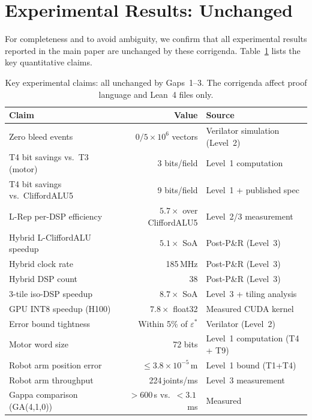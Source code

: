 \documentclass[11pt,a4paper]{article}
\theoremstyle{definition}
\theoremstyle{plain}
\theoremstyle{remark}
\begin{document}
\section{Experimental Results: Unchanged}
\label{sec:exp-unchanged}

For completeness and to avoid ambiguity, we confirm that all
experimental results reported in the main paper are unchanged by
these corrigenda.
Table~\ref{tab:unchanged} lists the key quantitative claims.

\begin{table}[h]
\centering
\caption{Key experimental claims: all unchanged by Gaps~1--3.
The corrigenda affect proof language and Lean~4 files only.}
\label{tab:unchanged}
\small
\begin{tabular}{p{5cm}rp{5cm}}
\toprule
Claim & Value & Source \\
\midrule
Zero bleed events & $0 / 5\times10^6$ vectors & Verilator simulation (Level~2) \\
T4 bit savings vs.\ T3 (motor) & 3 bits/field & Level~1 computation \\
T4 bit savings vs.\ CliffordALU5 & 9 bits/field & Level~1 + published spec \\
L-Rep per-DSP efficiency & $5.7\times$ over CliffordALU5 & Level~2/3 measurement \\
Hybrid L-CliffordALU speedup & $5.1\times$ SoA & Post-P\&R (Level~3) \\
Hybrid clock rate & 185\,MHz & Post-P\&R (Level~3) \\
Hybrid DSP count & 38 & Post-P\&R (Level~3) \\
3-tile iso-DSP speedup & $8.7\times$ SoA & Level~3 + tiling analysis \\
GPU INT8 speedup (H100) & $7.8\times$ float32 & Measured CUDA kernel \\
Error bound tightness & Within 5\% of $\varepsilon^*$ & Verilator (Level~2) \\
Motor word size & 72 bits & Level~1 computation (T4 + T9) \\
Robot arm position error & $\le 3.8\times10^{-5}$\,m & Level~1 bound (T1+T4) \\
Robot arm throughput & 224\,joints/ms & Level~3 measurement \\
Gappa comparison (GA(4,1,0)) & $>600$\,s vs.\ $<3.1$\,ms & Measured \\
\bottomrule
\end{tabular}
\end{table}
\end{document}
